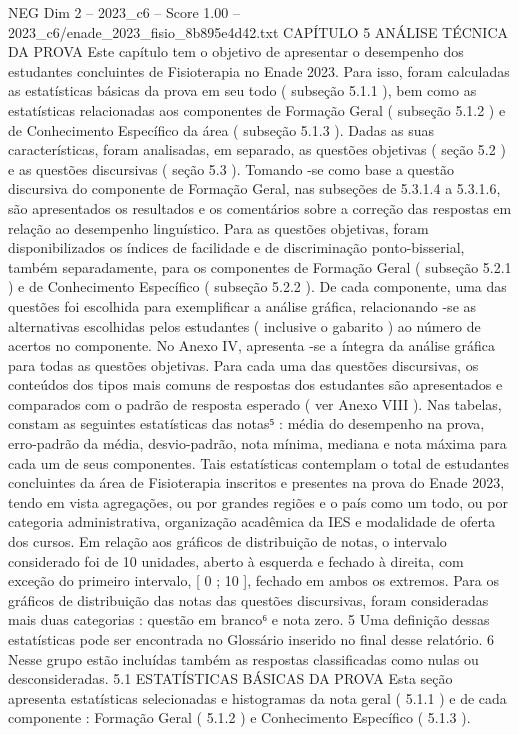 \begin{textsample}{NEG Dim 2 – 2023\_c6 – Score 1.00 – 2023\_c6/enade\_2023\_fisio\_8b895e4d42.txt}  \label{ex:f2_neg_266}
CAPÍTULO 5 ANÁLISE TÉCNICA DA PROVA Este capítulo tem o objetivo de apresentar o desempenho dos estudantes concluintes de Fisioterapia no Enade 2023.
Para isso, foram calculadas as estatísticas básicas da prova em seu todo ( subseção 5.1.1 ), bem como as estatísticas relacionadas aos componentes de Formação Geral ( subseção 5.1.2 ) e de Conhecimento Específico da área ( subseção 5.1.3 ).
Dadas as suas características, foram analisadas, em separado, as questões objetivas ( seção 5.2 ) e as questões discursivas ( seção 5.3 ).
Tomando -se como base a questão discursiva do componente de Formação Geral, nas subseções de 5.3.1.4 a 5.3.1.6, são apresentados os resultados e os comentários sobre a correção das respostas em relação ao desempenho linguístico.
Para as questões objetivas, foram disponibilizados os índices de facilidade e de discriminação ponto-bisserial, também separadamente, para os componentes de Formação Geral ( subseção 5.2.1 ) e de Conhecimento Específico ( subseção 5.2.2 ).
De cada componente, uma das questões foi escolhida para exemplificar a análise gráfica, relacionando -se as alternativas escolhidas pelos estudantes ( inclusive o gabarito ) ao número de acertos no componente.
No Anexo IV, apresenta -se a íntegra da análise gráfica para todas as questões objetivas.
Para cada uma das questões discursivas, os conteúdos dos tipos mais comuns de respostas dos estudantes são apresentados e comparados com o padrão de resposta esperado ( ver Anexo VIII ).
Nas tabelas, constam as seguintes estatísticas das notas⁵ : média do desempenho na prova, erro-padrão da média, desvio-padrão, nota mínima, mediana e nota máxima para cada um de seus componentes.
Tais estatísticas contemplam o total de estudantes concluintes da área de Fisioterapia inscritos e presentes na prova do Enade 2023, tendo em vista agregações, ou por grandes regiões e o país como um todo, ou por categoria administrativa, organização acadêmica da IES e modalidade de oferta dos cursos.
Em relação aos gráficos de distribuição de notas, o intervalo considerado foi de 10 unidades, aberto à esquerda e fechado à direita, com exceção do primeiro intervalo, [ 0 ; 10 ], fechado em ambos os extremos.
Para os gráficos de distribuição das notas das questões discursivas, foram consideradas mais duas categorias : questão em branco⁶ e nota zero. 5 Uma definição dessas estatísticas pode ser encontrada no Glossário inserido no final desse relatório. 6 Nesse grupo estão incluídas também as respostas classificadas como nulas ou desconsideradas. 5.1 ESTATÍSTICAS BÁSICAS DA PROVA Esta seção apresenta estatísticas selecionadas e histogramas da nota geral ( 5.1.1 ) e de cada componente : Formação Geral ( 5.1.2 ) e Conhecimento Específico ( 5.1.3 ).

\end{textsample}
